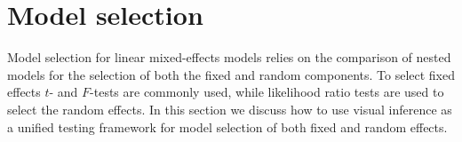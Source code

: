 \documentclass[12pt]{article} %
\newcommand{\hh}[1]{{\color{orange} #1}}
\begin{document}




\section{Model selection}\label{sec:select}



 Model selection for linear mixed-effects models relies on the comparison of nested models for the selection of both the fixed and random components. To select fixed effects $t$- and $F$-tests are commonly used, while likelihood ratio tests are used to select the random effects. 
 In this section we discuss how to use visual inference as a unified testing framework for model selection of both fixed and random effects.
\end{document}

